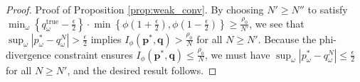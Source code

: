 \documentclass[opre,nonblindrev]{informs3} %
\newcommand{\q}{\mathbf{q}}
\newcommand{\p}{\mathbf{p}}
\newcommand{\qtrue}{\q^{\text{true}}}
\begin{document}
\begin{proof}{\sc Proof of Proposition \ref{prop:weak_conv}.}
	By choosing $N'\geq N''$ to satisfy $\min_{\omega} \left\{ q^{\text{true}}_\omega - \frac{\epsilon}{2} \right\} \cdot \min\left\{ \phi\left(1+\frac{\epsilon}{2}\right), \phi\left(1-\frac{\epsilon}{2}\right) \right\}\geq \frac{\rho_0}{N'}$, we see that $\sup_\omega |p_\omega^* - q^N_\omega| > \frac{\epsilon}{2}$ implies $I_\phi(\p^*,\q) > \frac{\rho_0}{N}$ for all $N \geq N'$. 
	Because the phi-divergence constraint ensures $I_\phi(\p^*,\q) \leq \frac{\rho_0}{N}$, we must have $\sup_\omega |p_\omega^* - q^N_\omega| \leq \frac{\epsilon}{2}$ for all $N \geq N'$, and the desired result follows. 
%
%
%
%
%

\end{proof}
\end{document}
